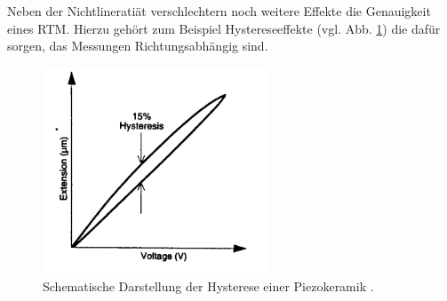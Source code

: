 Neben der Nichtlineratiät verschlechtern noch weitere
Effekte die Genauigkeit eines RTM. Hierzu gehört zum Beispiel Hystereseeffekte (vgl. Abb. \ref{fig: hysterese}) die dafür sorgen,
das Messungen Richtungsabhängig sind.
\begin{figure}[!h]
  \centering
  \includegraphics[width=0.6\textwidth]{./pics/hysterese.png}
  \caption{Schematische Darstellung der Hysterese einer Piezokeramik \cite{rtm}.}
  \label{fig: hysterese}
\end{figure}

